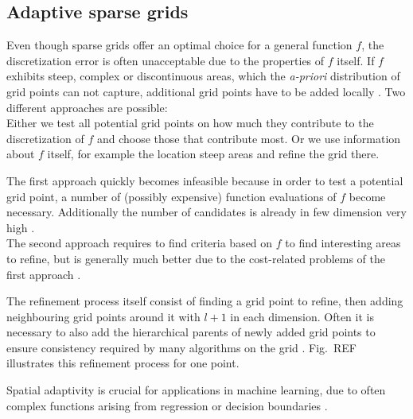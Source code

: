 \subsection{Adaptive sparse grids}\label{subsec:ada}

Even though sparse grids offer an optimal choice for a general function $f$,
the discretization error is often unacceptable due to
the properties of $f$ itself. If $f$ exhibits steep, complex
or discontinuous areas, which the \emph{a-priori} distribution of grid points
can not capture, additional grid points have to be added locally
\cite{disspfl}.
Two different approaches are possible: \\
Either we test all potential grid points on how much they contribute
to the discretization of $f$ and choose those that contribute most.
Or we use information about $f$ itself, for example the location steep areas
and refine the grid there.
\par
The first approach quickly becomes infeasible because in order to test
a potential grid point, a number of
(possibly expensive) function evaluations of $f$ become necessary. Additionally
the number of candidates is already in few dimension very high \cite{disspfl}. \\
The second approach requires to find criteria based on $f$ to
find interesting areas to refine, but is generally much better due to the
cost-related problems of the first approach \cite{disspfl}.
\par
The refinement process itself consist of finding a grid point to refine,
then adding neighbouring grid points around it with $l + 1$ in each dimension.
Often it is necessary to also add the hierarchical parents of newly added
grid points to ensure consistency required by many algorithms on the grid
\cite{disspfl}.
Fig.~REF illustrates this refinement process for one point.
\par
Spatial adaptivity is crucial for applications in machine learning, due to
often complex functions arising from regression or decision boundaries 
\cite{disspfl, artbunshort}.



